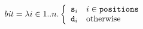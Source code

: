 \documentclass{book}
\renewcommand\textbackslash[0]{\unicode{x5C}}
\begin{document}




\[

    {\mathit{bit} = \lambda i \in 1..n.\left\{ \begin{array}{ll}
     \vs_i & i \in \positions\\
     \vd_i & \text{otherwise}
    \end{array} \right.}
\]
\end{document}
